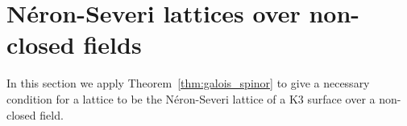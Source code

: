 \section{N\'eron-Severi lattices over non-closed fields}\label{sec:ns}
%
%
%
In this section we apply Theorem~\ref{thm:galois_spinor} to give a necessary condition for a lattice to be the N\'eron-Severi lattice of a K3 surface over a non-closed field. 

